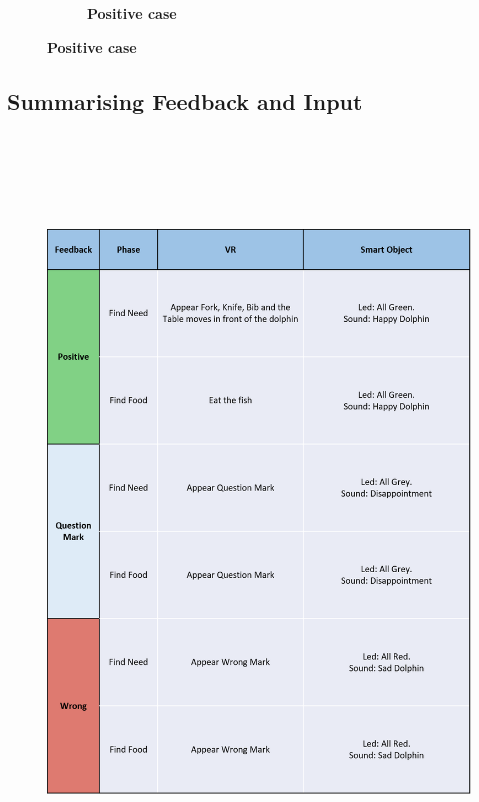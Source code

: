 \documentclass [12pt]{article}
\begin{document}
\begin{figure}[h!]
\begin{subfigure}[tr]{0.3\linewidth}
\caption{\textbf{Positive case}}
\end{subfigure}
\hspace*{\fill}
\end{figure}
\clearpage

\subsection{Summarising Feedback and Input}
\begin{figure}[ht!]
\centering
\includegraphics[height=20cm,width=15cm]{FeedbackUX1.png}
\end{figure}

\clearpage
\end{document}
